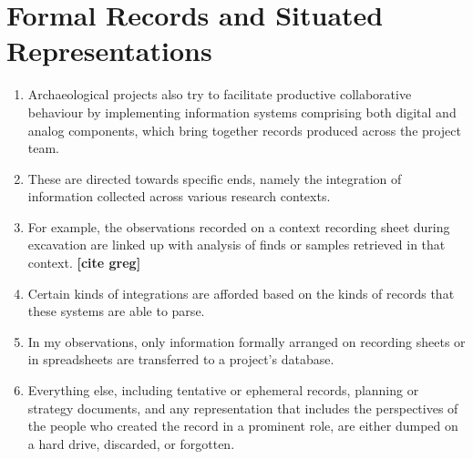 \documentclass{article}
\begin{document}
\section{Formal Records and Situated Representations}
\begin{enumerate}
  \item Archaeological projects also try to facilitate productive collaborative behaviour by implementing information systems comprising both digital and analog components, which bring together records produced across the project team.
  \item These are directed towards specific ends, namely the integration of information collected across various research contexts.
  \item For example, the observations recorded on a context recording sheet during excavation are linked up with analysis of finds or samples retrieved in that context. \textbf{[cite greg]}
  \item Certain kinds of integrations are afforded based on the kinds of records that these systems are able to parse.
  \item In my observations, only information formally arranged on recording sheets or in spreadsheets are transferred to a project's database.
  \item Everything else, including tentative or ephemeral records, planning or strategy documents, and any representation that includes the perspectives of the people who created the record in a prominent role, are either dumped on a hard drive, discarded, or forgotten.
\end{enumerate}
\end{document}
